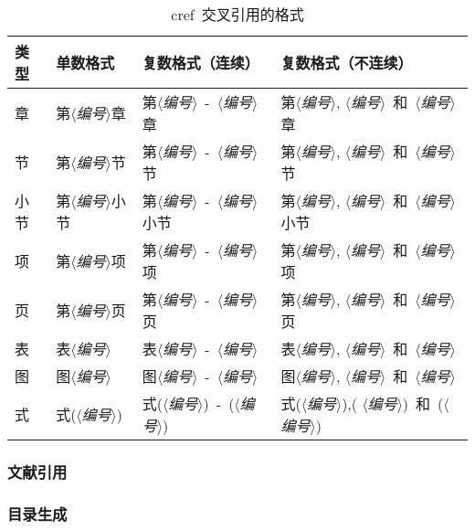 \begin{table}[ht]
	\centering
	\caption{cref~交叉引用的格式}
	\label{table_CrefFormat}
	\begin{tabular*}{\textwidth}{p{}p{}p{}p{}}
		\toprule
		\textbf{类型} & \textbf{单数格式} & \textbf{复数格式（连续）} & \textbf{复数格式（不连续）} \\
		\midrule
		章             & 第$\langle$\emph{编号}$\rangle$章   & 第$\langle$\emph{编号}$\rangle$~-~$\langle$\emph{编号}$\rangle$章 & 第$\langle$\emph{编号}$\rangle$, $\langle$\emph{编号}$\rangle$~和~$\langle$\emph{编号}$\rangle$章      \\
		节             & 第$\langle$\emph{编号}$\rangle$节   & 第$\langle$\emph{编号}$\rangle$~-~$\langle$\emph{编号}$\rangle$节 & 第$\langle$\emph{编号}$\rangle$, $\langle$\emph{编号}$\rangle$~和~$\langle$\emph{编号}$\rangle$节      \\
		小节             & 第$\langle$\emph{编号}$\rangle$小节   & 第$\langle$\emph{编号}$\rangle$~-~$\langle$\emph{编号}$\rangle$小节 & 第$\langle$\emph{编号}$\rangle$, $\langle$\emph{编号}$\rangle$~和~$\langle$\emph{编号}$\rangle$小节      \\
		项             & 第$\langle$\emph{编号}$\rangle$项   & 第$\langle$\emph{编号}$\rangle$~-~$\langle$\emph{编号}$\rangle$项 & 第$\langle$\emph{编号}$\rangle$, $\langle$\emph{编号}$\rangle$~和~$\langle$\emph{编号}$\rangle$项      \\
		页             & 第$\langle$\emph{编号}$\rangle$页   & 第$\langle$\emph{编号}$\rangle$~-~$\langle$\emph{编号}$\rangle$页 & 第$\langle$\emph{编号}$\rangle$, $\langle$\emph{编号}$\rangle$~和~$\langle$\emph{编号}$\rangle$页      \\
		表             & 表$\langle$\emph{编号}$\rangle$   & 表$\langle$\emph{编号}$\rangle$~-~$\langle$\emph{编号}$\rangle$ & 表$\langle$\emph{编号}$\rangle$, $\langle$\emph{编号}$\rangle$~和~$\langle$\emph{编号}$\rangle$      \\
		图             & 图$\langle$\emph{编号}$\rangle$   & 图$\langle$\emph{编号}$\rangle$~-~$\langle$\emph{编号}$\rangle$ & 图$\langle$\emph{编号}$\rangle$, $\langle$\emph{编号}$\rangle$~和~$\langle$\emph{编号}$\rangle$      \\
		式             & 式($\langle$\emph{编号}$\rangle$)   & 式($\langle$\emph{编号}$\rangle$)~-~($\langle$\emph{编号}$\rangle$) & 式($\langle$\emph{编号}$\rangle$),( $\langle$\emph{编号}$\rangle$)~和~($\langle$\emph{编号}$\rangle$)      \\
		\bottomrule
	\end{tabular*}
\end{table}




\subsubsection{文献引用}
\label{Subsubsect_Citations}

\subsubsection{目录生成}
\label{Subsubsect_CreatTOC}
